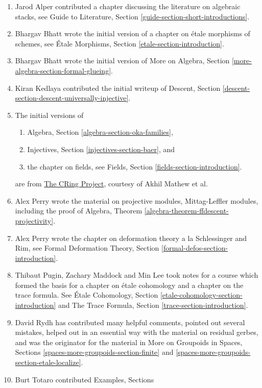 \begin{enumerate}
\item Jarod Alper contributed a chapter discussing the literature
on algebraic stacks, see
Guide to Literature, Section \ref{guide-section-short-introductions}.
\item Bhargav Bhatt wrote the initial version of a chapter
on \'etale morphisms of schemes, see
\'Etale Morphisms, Section \ref{etale-section-introduction}.
\item Bhargav Bhatt wrote the initial version of
More on Algebra, Section \ref{more-algebra-section-formal-glueing}.
\item Kiran Kedlaya contributed the initial writeup of
Descent, Section \ref{descent-section-descent-universally-injective}.
\item The initial versions of
\begin{enumerate}
\item Algebra, Section \ref{algebra-section-oka-families},
\item Injectives, Section \ref{injectives-section-baer}, and
\item the chapter on fields, see
Fields, Section \ref{fields-section-introduction}.
\end{enumerate}
are from
\href{https://math.uchicago.edu/~amathew/cr.html}{The CRing Project},
courtesy of Akhil Mathew et al.
\item Alex Perry wrote the material on projective modules,
Mittag-Leffler modules, including the proof of
Algebra, Theorem \ref{algebra-theorem-ffdescent-projectivity}.
\item Alex Perry wrote the chapter on deformation theory a la Schlessinger
and Rim, see
Formal Deformation Theory, Section \ref{formal-defos-section-introduction}.
\item Thibaut Pugin, Zachary Maddock and Min Lee took notes for
a course which formed the basis for a chapter on \'etale cohomology
and a chapter on the trace formula. See
\'Etale Cohomology, Section \ref{etale-cohomology-section-introduction}
and
The Trace Formula, Section \ref{trace-section-introduction}.
\item David Rydh has contributed many helpful comments, pointed out several
mistakes, helped out in an essential way with the material on residual gerbes,
and was the originator for the material in
More on Groupoids in Spaces, Sections
\ref{spaces-more-groupoids-section-finite} and
\ref{spaces-more-groupoids-section-etale-localize}.
\item Burt Totaro contributed Examples, Sections

\end{enumerate}

